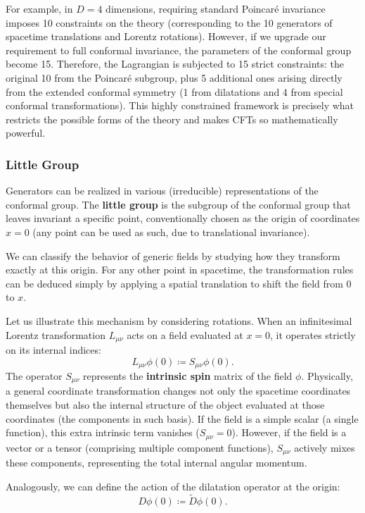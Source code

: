 For example, in \(D=4\) dimensions, requiring standard Poincar\'e invariance imposes 10 constraints on the theory (corresponding to the 10 generators of spacetime translations and Lorentz rotations). However, if we upgrade our requirement to full conformal invariance, the parameters of the conformal group become 15. Therefore, the Lagrangian is subjected to 15 strict constraints: the original 10 from the Poincar\'e subgroup, plus 5 additional ones arising directly from the extended conformal symmetry (1 from dilatations and 4 from special conformal transformations). This highly constrained framework is precisely what restricts the possible forms of the theory and makes CFTs so mathematically powerful.

\subsubsection{Little Group}

Generators can be realized in various (irreducible) representations of the conformal group. The \textbf{little group} is the subgroup of the conformal group that leaves invariant a specific point, conventionally chosen as the origin of coordinates \(x=0\) (any point can be used as such, due to translational invariance).

We can classify the behavior of generic fields by studying how they transform exactly at this origin. For any other point in spacetime, the transformation rules can be deduced simply by applying a spatial translation to shift the field from \(0\) to \(x\).

Let us illustrate this mechanism by considering rotations. When an infinitesimal Lorentz transformation \(L_{\mu\nu}\) acts on a field evaluated at \(x=0\), it operates strictly on its internal indices:
\[
    L_{\mu\nu}\phi(0)\coloneq S_{\mu\nu}\phi(0).
\]
The operator \(S_{\mu\nu}\) represents the \textbf{intrinsic spin} matrix of the field \(\phi\). Physically, a general coordinate transformation changes not only the spacetime coordinates themselves but also the internal structure of the object evaluated at those coordinates (the components in such basis). If the field is a simple scalar (a single function), this extra intrinsic term vanishes (\(S_{\mu\nu} = 0\)). However, if the field is a vector or a tensor (comprising multiple component functions), \(S_{\mu\nu}\) actively mixes these components, representing the total internal angular momentum.

Analogously, we can define the action of the dilatation operator at the origin:
\[
    D\phi(0)\coloneq \tilde{D}\phi(0).
\]

